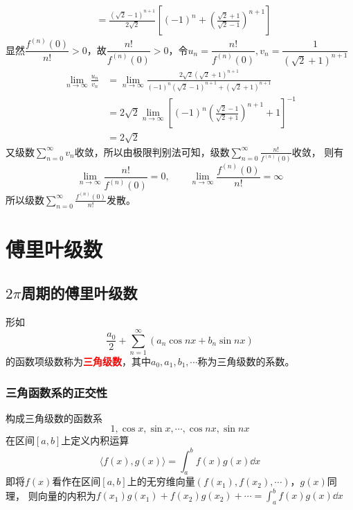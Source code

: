 \begin{solution}
\begin{enumerate}[(1)]
\begin{align*}
                   & = \frac{(\sqrt{2}-1)^{n+1}}{2\sqrt{2}}\left[(-1)^n + \left(\frac{\sqrt{2}+1}{\sqrt{2}-1}\right)^{n+1}\right]
              \end{align*}
              显然$\dfrac{f^{(n)}(0)}{n!}>0$，故$\dfrac{n!}{f^{(n)}(0)}>0$，令$u_n=\dfrac{n!}{f^{(n)}(0)},v_n = \dfrac{1}{(\sqrt{2}+1)^{n+1}}$
              \begin{align*}
                  \lim_{n\to\infty} \frac{u_n}{v_n}
                   & = \lim_{n\to\infty} \frac{2\sqrt{2}(\sqrt{2}+1)^{n+1}}{(-1)^n(\sqrt{2}-1)^{n+1} + (\sqrt{2}+1)^{n+1}}     \\
                   & = 2\sqrt{2}\lim_{n\to\infty} \left[(-1)^n\left(\frac{\sqrt{2}-1}{\sqrt{2}+1}\right)^{n+1} + 1\right]^{-1} \\
                   & = 2\sqrt{2}
              \end{align*}
              又级数$\displaystyle\sum_{n=0}^\infty v_n$收敛，所以由极限判别法可知，级数$\displaystyle\sum_{n=0}^\infty \frac{n!}{f^{(n)}(0)}$收敛，
              则有\[\lim_{n\to\infty} \frac{n!}{f^{(n)}(0)} = 0,\qquad \lim_{n\to\infty} \frac{f^{(n)}(0)}{n!} =\infty \]
              所以级数$\displaystyle\sum_{n=0}^\infty \frac{f^{(n)}(0)}{n!}$发散。

    \end{enumerate}
\end{solution}

\section{傅里叶级数}
\subsection{\texorpdfstring{$2\pi$}{2π}周期的傅里叶级数}
形如
\begin{equation}
    \frac{a_0}{2} + \sum_{n=1}^\infty(a_n\cos nx + b_n\sin nx)
\end{equation}
的函数项级数称为\textcolor{red}{\textbf{\textsf{三角级数}}}，其中$a_0,a_1,b_1,\cdots$称为三角级数的系数。

\subsubsection{三角函数系的正交性}
构成三角级数的函数系
\[ 1,\cos x,\sin x,\cdots,\cos nx, \sin nx \]
在区间$[a,b]$上定义内积运算
\begin{equation}
    \langle f(x),g(x) \rangle  = \int_a^b f(x)g(x)\dd{x}
\end{equation}
即将$f(x)$看作在区间$[a,b]$上的无穷维向量$(f(x_1),f(x_2),\cdots)$，$g(x)$同理，
则向量的内积为$f(x_1)g(x_1)+f(x_2)g(x_2)+\cdots = \int_a^b f(x)g(x)\dd{x}$


